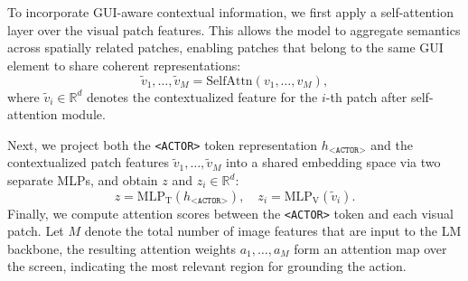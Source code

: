 \documentclass{article}
\begin{document}


To incorporate GUI-aware contextual information, we first apply a self-attention layer over the visual patch features. This allows the model to aggregate semantics across spatially related patches, enabling patches that belong to the same GUI element to share coherent representations:
\begin{equation}
\tilde{v}_1, \dots, \tilde{v}_M = \text{SelfAttn}(v_1, \dots, v_M),
\end{equation}
where $\tilde{v}_i \in \mathbb{R}^d$ denotes the contextualized feature for the $i$-th patch after self-attention module.

Next, we project both the \texttt{<ACTOR>} token representation $h_{\texttt{<ACTOR>}}$ and the contextualized patch features ${\tilde{v}_1, \dots, \tilde{v}_M}$ into a shared embedding space via two separate MLPs, 
and obtain $z$ and $z_i \in \mathbb{R}^d$:
\begin{equation}
z = \text{MLP}_{\text{T}}(h_{\texttt{<ACTOR>}}), \quad z_i = \text{MLP}_{\text{V}}(\tilde{v}_i).
\end{equation}
Finally, we compute attention scores between the \texttt{<ACTOR>} token and each visual patch. Let $M$ denote the total number of image features that are input to the LM backbone, the resulting attention weights ${a_1, \dots, a_M}$ form an attention map over the screen, indicating the most relevant region for grounding the action.
\end{document}
